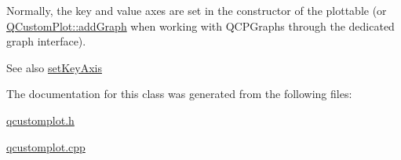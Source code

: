 Normally, the key and value axes are set in the constructor of the plottable (or \hyperlink{classQCustomPlot_a6fb2873d35a8a8089842d81a70a54167}{Q\+Custom\+Plot\+::add\+Graph} when working with Q\+C\+P\+Graphs through the dedicated graph interface).

\begin{DoxySeeAlso}{See also}
\hyperlink{classQCPAbstractPlottable_a8524fa2994c63c0913ebd9bb2ffa3920}{set\+Key\+Axis} 
\end{DoxySeeAlso}


The documentation for this class was generated from the following files\+:\begin{DoxyCompactItemize}
\item 
\hyperlink{qcustomplot_8h}{qcustomplot.\+h}\item 
\hyperlink{qcustomplot_8cpp}{qcustomplot.\+cpp}\end{DoxyCompactItemize}
